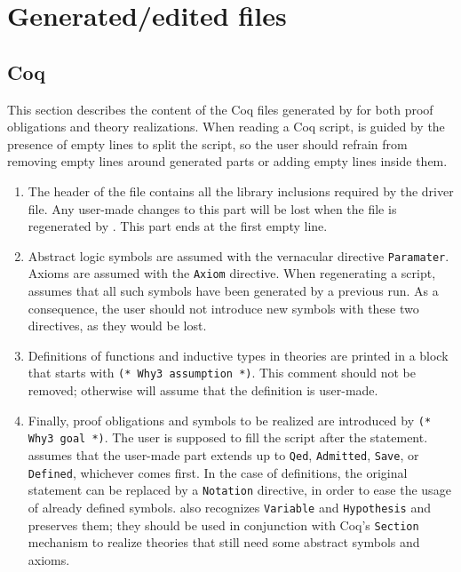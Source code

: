 \section{Generated/edited files}

\subsection{Coq}

This section describes the content of the Coq files generated by \why for
both proof obligations and theory realizations. When reading a Coq
script, \why is guided by the presence of empty lines to split the
script, so the user should refrain from removing empty lines around
generated parts or adding empty lines inside them.

\begin{enumerate}
\item	The header of the file contains all the library inclusions
	required by the driver file. Any user-made changes to this part
	will be lost when the file is regenerated by \why. This part ends
	at the first empty line.
\item	Abstract logic symbols are assumed with the vernacular directive
	\verb+Paramater+. Axioms are assumed with the \verb+Axiom+
	directive. When regenerating a script, \why assumes that all such
	symbols have been generated by a previous run. As a consequence,
	the user should not introduce new symbols with these two
	directives, as they would be lost.
\item	Definitions of functions and inductive types in theories are
	printed in a block that starts with \verb+(* Why3 assumption *)+.
	This comment should not be removed; otherwise \why will assume
	that the definition is user-made.
\item	Finally, proof obligations and symbols to be realized are
	introduced by \verb+(* Why3 goal *)+. The user is supposed to
	fill the script after the statement. \why assumes that the
	user-made part extends up to \verb+Qed+, \verb+Admitted+,
	\verb+Save+, or \verb+Defined+, whichever comes first. In the
	case of definitions, the original statement can be replaced by
	a \verb+Notation+ directive, in order to ease the usage of
	already defined symbols. \why also recognizes \verb+Variable+
	and \verb+Hypothesis+ and preserves them; they should be used in
	conjunction with Coq's \verb+Section+ mechanism to realize
	theories that still need some abstract symbols and axioms.
\end{enumerate}

